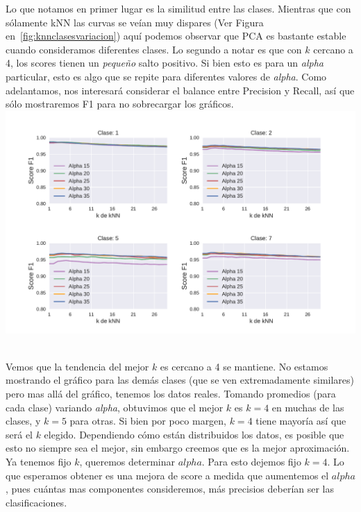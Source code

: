 Lo que notamos en primer lugar es la similitud entre las clases. Mientras que con sólamente kNN las curvas se veían muy dispares (Ver Figura en~\ref{fig:knnclasesvariacion}) aquí podemos observar que PCA es bastante estable cuando consideramos diferentes clases. Lo segundo a notar es que con $k$ cercano a 4, los scores tienen un \textit{pequeño} salto positivo. Si bien esto es para un \textit{alpha} particular, esto es algo que se repite para diferentes valores de \textit{alpha}. Como adelantamos, nos interesará considerar el balance entre Precision y Recall, así que sólo mostraremos F1 para no sobrecargar los gráficos. \\

{\centering
    \includegraphics[scale=0.65]{informe/imagenes/pca/variacionKClases1257.pdf} \\
}
$ $\newline

Vemos que la tendencia del mejor $k$ es cercano a 4 se mantiene. No estamos mostrando el gráfico para las demás clases (que se ven extremadamente similares) pero mas allá del gráfico, tenemos los datos reales. Tomando promedios (para cada clase) variando \textit{alpha}, obtuvimos que el mejor $k$ es $k=4$ en muchas de las clases, y $k=5$ para otras. Si bien por poco margen, $k=4$ tiene mayoría así que será el $k$ elegido. Dependiendo cómo están distribuidos los datos, es posible que esto no siempre sea el mejor, sin embargo creemos que es la mejor aproximación. \\

Ya tenemos fijo $k$, queremos determinar $alpha$. Para esto dejemos fijo $k=4$. Lo que esperamos obtener es una mejora de score a medida que aumentemos el $alpha$, pues cuántas mas componentes consideremos, más precisios deberían ser las clasificaciones. \\

